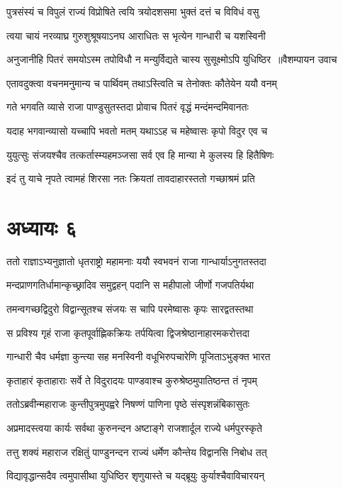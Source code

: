 \twolineshloka
{पुत्रसंस्यं च विपुलं राज्यं विप्रोषिते त्वयि}
{त्रयोदशसमा भुक्तं दत्तं च विविधं वसु}


\twolineshloka
{त्वया चायं नरव्याघ्र गुरुशुश्रूषयाऽनघ}
{आराधितः स भृत्येन गान्धारी च यशस्विनी}


\threelineshloka
{अनुजानीहि पितरं समयोऽस्म तपोविधौ}
{न मन्युर्विद्यते चास्य सुसूक्ष्मोऽपि युधिष्ठिर ॥वैशम्पायन उवाच}
{}


\twolineshloka
{एतावदुक्त्वा वचनमनुमान्य च पार्थिवम्}
{तथाऽस्त्विति च तेनोक्तः कौतेयेन ययौ वनम्}


\twolineshloka
{गते भगवति व्यासे राजा पाण्डुसुतस्तदा}
{प्रोवाच पितरं वृद्धं मन्दंमन्दमिवानतः}


\twolineshloka
{यदाह भगवान्व्यासो यच्चापि भवतो मतम्}
{यथाऽऽह च महेष्वासः कृपो विदुर एव च}


\twolineshloka
{युयुत्सुः संजयश्चैव तत्कर्तास्म्यहमञ्जसा}
{सर्व एव हि मान्या मे कुलस्य हि हितैषिणः}


\twolineshloka
{इदं तु याचे नृपते त्वामहं शिरसा नतः}
{क्रियतां तावदाहारस्ततो गच्छाश्रमं प्रति}


\chapter{अध्यायः ६}
\twolineshloka
{ततो राज्ञाऽभ्यनुज्ञातो धृतराष्ट्रो महामनाः}
{ययौ स्वभवनं राजा गान्धार्याऽनुगतस्तदा}


\twolineshloka
{मन्दप्राणगतिर्धामान्कृच्छ्रादिव समुद्वहन्}
{पदानि स महीपालो जीर्णो गजपतिर्यथा}


\twolineshloka
{तमन्वगच्छद्विदुरो विद्वान्सूतश्च संजयः}
{स चापि परमेष्वासः कृपः सारद्वतस्तथा}


\twolineshloka
{स प्रविश्य गृहं राजा कृतपूर्वाह्णिकक्रियः}
{तर्पयित्वा द्विजश्रेष्ठानाहारमकरोत्तदा}


\twolineshloka
{गान्धारी चैव धर्मज्ञा कुन्त्या सह मनस्विनी}
{वधूभिरुपचारेणि पूजिताऽभुङ्क्त भारत}


\twolineshloka
{कृताहारं कृताहाराः सर्वे ते विदुरादयः}
{पाण्डवाश्च कुरुश्रेष्ठमुपातिष्ठन्त तं नृपम्}


\twolineshloka
{ततोऽब्रवीन्महाराजः कुन्तीपुत्रमुपह्वरे}
{निषण्णं पाणिना पृष्ठे संस्पृशन्नंबिकासुतः}


\twolineshloka
{अप्रमादस्त्वया कार्यः सर्वथा कुरुनन्दन}
{अष्टाङ्गे राजशार्दूल राज्ये धर्मपुरस्कृते}


\twolineshloka
{तत्तु शक्यं महाराज रक्षितुं पाण्डुनन्दन}
{राज्यं धर्मेण कौन्तेय विद्वानसि निबोध तत्}


\twolineshloka
{विद्यावृद्धान्सदैव त्वमुपासीथा युधिष्ठिर}
{शृणुयास्ते च यद्ब्रूयुः कुर्याश्चैवाविचारयन्}


